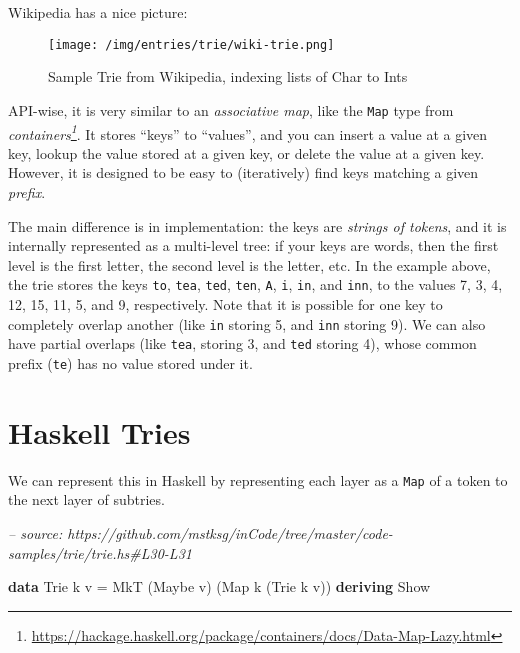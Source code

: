 \documentclass[]{article}
\newenvironment{Shaded}{}{}
\newcommand{\CommentTok}[1]{\textcolor[rgb]{0.38,0.63,0.69}{\textit{#1}}}
\newcommand{\DataTypeTok}[1]{\textcolor[rgb]{0.56,0.13,0.00}{#1}}
\newcommand{\FunctionTok}[1]{\textcolor[rgb]{0.02,0.16,0.49}{#1}}
\newcommand{\KeywordTok}[1]{\textcolor[rgb]{0.00,0.44,0.13}{\textbf{#1}}}
\newcommand{\NormalTok}[1]{#1}
\renewcommand{\href}[2]{#2\footnote{\url{#1}}}
\begin{document}
Wikipedia has a nice picture:

\begin{figure}
\centering
\texttt{[image: /img/entries/trie/wiki-trie.png]}
\caption{Sample Trie from Wikipedia, indexing lists of Char to Ints}
\end{figure}

API-wise, it is very similar to an \emph{associative map}, like the \texttt{Map}
type from
\emph{\href{https://hackage.haskell.org/package/containers/docs/Data-Map-Lazy.html}{containers}}.
It stores ``keys'' to ``values'', and you can insert a value at a given key,
lookup the value stored at a given key, or delete the value at a given key.
However, it is designed to be easy to (iteratively) find keys matching a given
\emph{prefix}.

The main difference is in implementation: the keys are \emph{strings of tokens},
and it is internally represented as a multi-level tree: if your keys are words,
then the first level is the first letter, the second level is the letter, etc.
In the example above, the trie stores the keys \texttt{to}, \texttt{tea},
\texttt{ted}, \texttt{ten}, \texttt{A}, \texttt{i}, \texttt{in}, and
\texttt{inn}, to the values 7, 3, 4, 12, 15, 11, 5, and 9, respectively. Note
that it is possible for one key to completely overlap another (like \texttt{in}
storing 5, and \texttt{inn} storing 9). We can also have partial overlaps (like
\texttt{tea}, storing 3, and \texttt{ted} storing 4), whose common prefix
(\texttt{te}) has no value stored under it.

\hypertarget{haskell-tries}{%
\section{Haskell Tries}\label{haskell-tries}}

We can represent this in Haskell by representing each layer as a \texttt{Map} of
a token to the next layer of subtries.

\begin{Shaded}
\begin{Highlighting}[]
\CommentTok{-- source: https://github.com/mstksg/inCode/tree/master/code-samples/trie/trie.hs#L30-L31}

\KeywordTok{data} \DataTypeTok{Trie}\NormalTok{  k v   }\FunctionTok{=} \DataTypeTok{MkT}\NormalTok{  (}\DataTypeTok{Maybe}\NormalTok{ v) (}\DataTypeTok{Map}\NormalTok{ k (}\DataTypeTok{Trie}\NormalTok{ k v))}
  \KeywordTok{deriving} \DataTypeTok{Show}
\end{Highlighting}
\end{Shaded}
\end{document}
